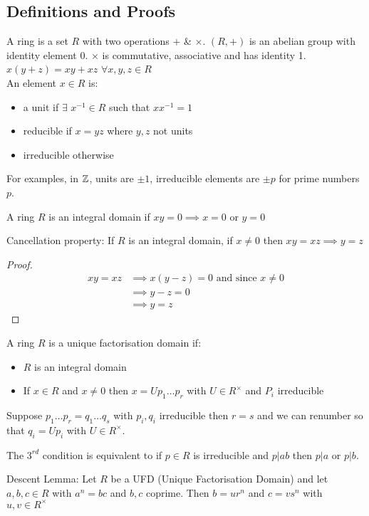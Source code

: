 \documentclass[11pt]{article}
\begin{document}
\subsection{Definitions and Proofs}
A ring is a set $R$ with two operations $ + $ \& $  \times $. 
$(R, +)$ is an abelian group with identity element $0$. 
$\times $ is commutative, associative and has identity 1. 
$x(y+z) = xy+xz$ $\forall x,y,z \in R$
$ $\\[1em]
An element $x \in R$ is:
\begin{itemize}
	\item{a unit if $\exists $ $x^{-1} \in R $ such that $xx^{-1} = 1$ }
	\item{reducible if $x=yz $ where $y,z$ not units}
	\item{irreducible otherwise}
\end{itemize}
For examples, in $\mathbb{Z}$, units are $\pm1$, irreducible elements are $\pm p $ for prime numbers $p$.

\begin{defn}
	A ring $R$ is an integral domain if $xy=0 \implies x=0$ or $y=0$
\end{defn}
\begin{lemma}
	Cancellation property: If $R$ is an integral domain, if $x \neq 0$ then $xy=xz \implies y=z$
\end{lemma}
\begin{proof}
	\begin{align*}
	xy =xz &\implies x(y-z) = 0 \text{ and since } x\neq 0\\
		&\implies y-z =0 \\
		&\implies y=z
	\end{align*}
\end{proof}
$ $\\
A ring $R$ is a unique factorisation domain if:
\begin{itemize}
	\item{$R$ is an integral domain}
	\item{If $x \in R$ and $x \neq 0 $ then $x=Up_1 \dots p_r$  with $U \in R^\times $ and $P_i$ irreducible }
\end{itemize}
$ $\\
Suppose $p_1 \dots p_r  = q_1 \dots q_s$ with $p_i, q_i$ irreducible then $r=s$ and we can renumber so that $q_i = Up_i$ with $U \in R^\times$.

The $3^{rd}$ condition is equivalent to if $p \in R$ is irreducible and $p|ab $ then $p| a$ or $p | b$.

\begin{lemma}
	Descent Lemma: Let $R$ be a UFD (Unique Factorisation Domain) and let $a,b,c \in R$ with $a^n = bc $ and $b,c$ coprime.
	Then $b = ur^n$ and $c= vs^n$ with $u,v \in R^\times$
\end{lemma}
\end{document}
